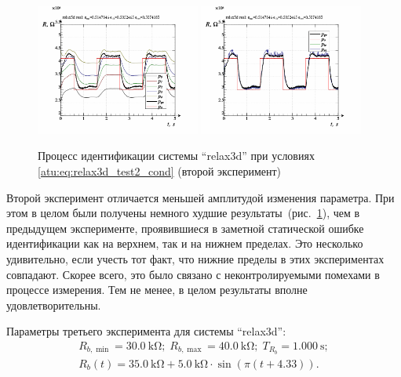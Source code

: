 \begin{figure}[htb!]
  \centerline{
    \includegraphics[width=0.48\textwidth]{p/relax3d_read_id2-p_p_01.png}
    \hfill
    \includegraphics[width=0.48\textwidth]{p/relax3d_read_id2-p_pp_01.png}
  }
  \caption{Процесс идентификации системы ``relax3d'' при условиях \ref{atu:eq:relax3d_test2_cond} (второй эксперимент)}
  \label{atu:f:relax3d_id_2}
\end{figure}

Второй эксперимент отличается меньшей амплитудой изменения параметра.
При этом в целом были получены немного худшие результаты~(рис.~\ref{atu:f:relax3d_id_2}),
чем в предыдущем эксперименте,
проявившиеся в заметной статической ошибке идентификации как на верхнем,
так и на нижнем пределах. Это несколько удивительно, если учесть
тот факт, что нижние пределы в этих экспериментах совпадают.
Скорее всего, это было связано с неконтролируемыми помехами
в процессе измерения. Тем не менее, в целом результаты вполне удовлетворительны.



Параметры третьего эксперимента для системы ``relax3d'':
%
\begin{equation}
  \begin{array}{c}
    R_{b,\min} = \SI{30.0}{\kilo\ohm};
    \;
    R_{b,\max} = \SI{40.0}{\kilo\ohm};
    \;
    T_{R_b} = \SI{1.000}{\second};
  \\
    R_b(t) = \SI{35.0}{\kilo\ohm} + \SI{5.0}{\kilo\ohm} \cdot \sin( \pi ( t + 4.33 ) ).
  \end{array}
  \label{atu:eq:relax3d_test3_cond}
\end{equation}

